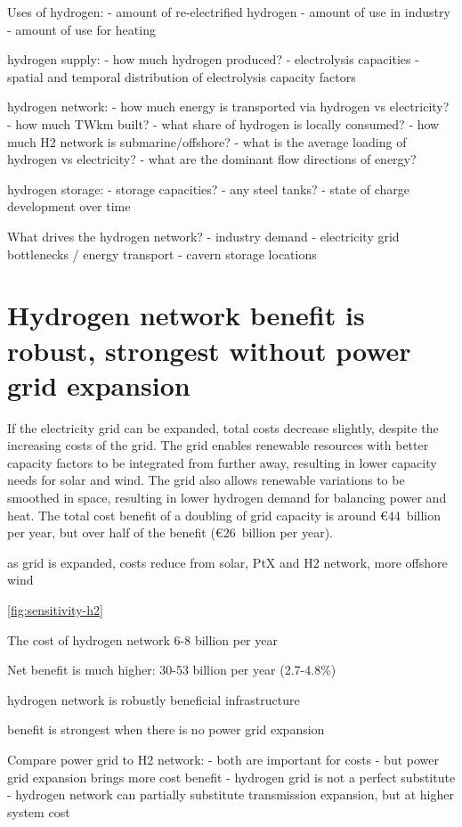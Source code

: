 Uses of hydrogen:
- amount of re-electrified hydrogen
- amount of use in industry
- amount of use for heating

hydrogen supply:
- how much hydrogen produced?
- electrolysis capacities
- spatial and temporal distribution of electrolysis capacity factors

hydrogen network:
- how much energy is transported via hydrogen vs electricity?
- how much TWkm built?
- what share of hydrogen is locally consumed?
- how much H2 network is submarine/offshore?
- what is the average loading of hydrogen vs electricity?
- what are the dominant flow directions of energy?

hydrogen storage:
- storage capacities?
- any steel tanks?
- state of charge development over time

What drives the hydrogen network?
- industry demand
- electricity grid bottlenecks / energy transport
- cavern storage locations

\section*{Hydrogen network benefit is robust, strongest without power grid expansion}
\label{sec:h2}

If the electricity grid can be expanded, total costs decrease
slightly, despite the increasing costs of the grid. The grid enables
renewable resources with better capacity factors to be integrated from
further away, resulting in lower capacity needs for solar and
wind. The grid also allows renewable variations to be smoothed in space,
resulting in lower hydrogen demand for balancing power and heat.  The
total cost benefit of a doubling of grid capacity is around
\euro44~billion per year, but over half of the benefit (\euro26~billion per year).

as grid is expanded, costs reduce from solar, PtX and H2 network, more offshore wind


\cref{fig:sensitivity-h2}

The cost of hydrogen network 6-8 billion per year

Net benefit is much higher: 30-53 billion per year (2.7-4.8\%)

hydrogen network is robustly beneficial infrastructure

benefit is strongest when there is no power grid expansion

Compare power grid to H2 network:
- both are important for costs
- but power grid expansion brings more cost benefit
- hydrogen grid is not a perfect substitute
- hydrogen network can partially substitute transmission expansion, but at higher system cost

